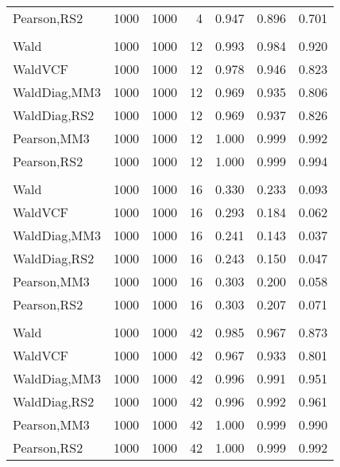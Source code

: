 \documentclass[
]{article}
\begin{document}
\begin{table}[H]
{\begin{tabular}[t]{lrrrrrr}
\hspace{1em}Pearson,RS2 & 1000 & 1000 & 4 & 0.947 & 0.896 & 0.701\\
\addlinespace[0.3em]
\multicolumn{7}{l}{\textbf{1F 15V}}\\
\hspace{1em}Wald & 1000 & 1000 & 12 & 0.993 & 0.984 & 0.920\\
\hspace{1em}WaldVCF & 1000 & 1000 & 12 & 0.978 & 0.946 & 0.823\\
\hspace{1em}WaldDiag,MM3 & 1000 & 1000 & 12 & 0.969 & 0.935 & 0.806\\
\hspace{1em}WaldDiag,RS2 & 1000 & 1000 & 12 & 0.969 & 0.937 & 0.826\\
\hspace{1em}Pearson,MM3 & 1000 & 1000 & 12 & 1.000 & 0.999 & 0.992\\
\hspace{1em}Pearson,RS2 & 1000 & 1000 & 12 & 1.000 & 0.999 & 0.994\\
\addlinespace[0.3em]
\multicolumn{7}{l}{\textbf{2F 10V}}\\
\hspace{1em}Wald & 1000 & 1000 & 16 & 0.330 & 0.233 & 0.093\\
\hspace{1em}WaldVCF & 1000 & 1000 & 16 & 0.293 & 0.184 & 0.062\\
\hspace{1em}WaldDiag,MM3 & 1000 & 1000 & 16 & 0.241 & 0.143 & 0.037\\
\hspace{1em}WaldDiag,RS2 & 1000 & 1000 & 16 & 0.243 & 0.150 & 0.047\\
\hspace{1em}Pearson,MM3 & 1000 & 1000 & 16 & 0.303 & 0.200 & 0.058\\
\hspace{1em}Pearson,RS2 & 1000 & 1000 & 16 & 0.303 & 0.207 & 0.071\\
\addlinespace[0.3em]
\multicolumn{7}{l}{\textbf{3F 15V}}\\
\hspace{1em}Wald & 1000 & 1000 & 42 & 0.985 & 0.967 & 0.873\\
\hspace{1em}WaldVCF & 1000 & 1000 & 42 & 0.967 & 0.933 & 0.801\\
\hspace{1em}WaldDiag,MM3 & 1000 & 1000 & 42 & 0.996 & 0.991 & 0.951\\
\hspace{1em}WaldDiag,RS2 & 1000 & 1000 & 42 & 0.996 & 0.992 & 0.961\\
\hspace{1em}Pearson,MM3 & 1000 & 1000 & 42 & 1.000 & 0.999 & 0.990\\
\hspace{1em}Pearson,RS2 & 1000 & 1000 & 42 & 1.000 & 0.999 & 0.992\\
\bottomrule
\end{tabular}}
\endgroup{}
\end{table}
\end{document}
